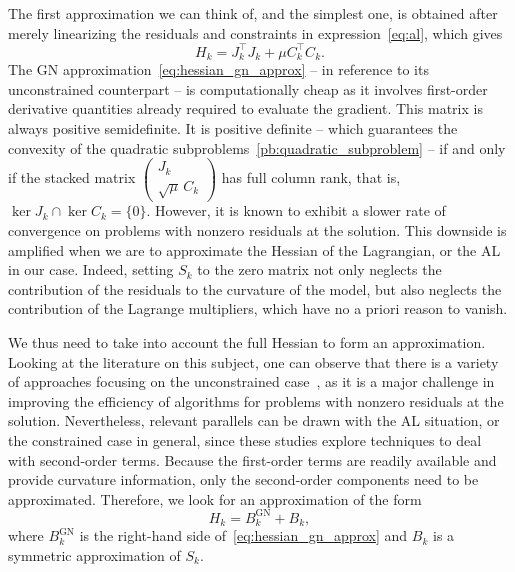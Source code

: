 \documentclass{article}
\numberwithin{equation}{section}
\theoremstyle{plain}
\begin{document}
The first approximation we can think of, and the simplest one, is obtained after merely linearizing the residuals and constraints in expression~\eqref{eq:al}, which gives
\begin{equation}\label{eq:hessian_gn_approx}
	H_k = J_k^\top J_k + \mu C_k^\top C_k.
\end{equation}
The GN approximation~\eqref{eq:hessian_gn_approx} -- in reference to its unconstrained counterpart -- is computationally cheap as it involves first-order derivative quantities already required to evaluate the gradient. This matrix is always positive semidefinite. It is positive definite -- which guarantees the convexity of the quadratic subproblems~\eqref{pb:quadratic_subproblem} -- if and only if the stacked matrix $\left(\begin{smallmatrix} J_k \\ \sqrt{\mu}\,C_k \end{smallmatrix}\right)$ has full column rank, that is, $\ker J_k \cap \ker C_k = \{0\}$. However, it is known to exhibit a slower rate of convergence on problems with nonzero residuals at the solution. This downside is amplified when we are to approximate the Hessian of the Lagrangian, or the AL in our case. Indeed, setting $S_k$ to the zero matrix not only neglects the contribution of the residuals to the curvature of the model, but also neglects the contribution of the Lagrange multipliers, which have no a priori reason to vanish.

	We thus need to take into account the full Hessian to form an approximation. Looking at the literature on this subject, one can observe that there is a variety of approaches focusing on the unconstrained case~\cite{biggs:1977,dennisetal:1981,huschens1994,yabetakahashi:1991,zhang-etal:2000,lucksan-etal:2019}, as it is a major challenge in improving the efficiency of algorithms for problems with nonzero residuals at the solution. Nevertheless, relevant parallels can be drawn with the AL situation, or the constrained case in general, since these studies explore techniques to deal with second-order terms. Because the first-order terms are readily available and provide curvature information, only the second-order components need to be approximated. Therefore, we look for an approximation of the form 
	\begin{equation}\label{eq:hessian_full_approx}
		H_k = B^{\mathrm{GN}}_k + B_k,
	\end{equation}
	where $B^{\mathrm{GN}}_k$ is the right-hand side of~\eqref{eq:hessian_gn_approx} and $B_k$ is a symmetric approximation of $S_k$. 
\end{document}
